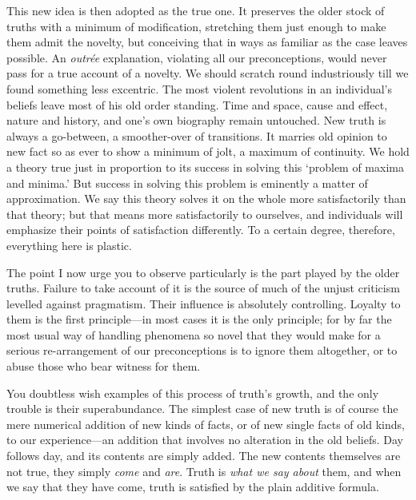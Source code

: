 This new idea is then adopted as the true one. It preserves the older
stock of truths with a minimum of modification, stretching them just
enough to make them admit the novelty, but conceiving that in ways as
familiar as the case leaves possible. An \textit{outr\'ee}
explanation, violating all our preconceptions, would never pass for a
true account of a novelty. We should scratch round industriously till
we found something less excentric. The most violent revolutions in an
individual's beliefs leave most of his old order standing. Time and
space, cause and  effect, nature and history, and one's own
biography remain untouched. New truth is always a go-between, a
smoother-over of transitions. It marries old opinion to new fact so as
ever to show a minimum of jolt, a maximum of continuity. We hold a
theory true just in proportion to its success in solving this `problem
of maxima and minima.' But success in solving this problem is
eminently a matter of approximation. We say this theory solves it on
the whole more satisfactorily than that theory; but that means more
satisfactorily to ourselves, and individuals will emphasize their
points of satisfaction differently. To a certain degree, therefore,
everything here is plastic.

The point I now urge you to observe particularly is the part played by
the older truths. Failure to take account of it is the source of much
of the unjust criticism levelled against pragmatism. Their influence
is absolutely controlling. Loyalty to them is the first
prin\-ci\-ple---in most cases it is the only principle; for by far the
most usual way of handling phenomena so novel that they would make for
a serious re-arrangement of our preconceptions is to ignore
them altogether, or to abuse those who bear witness for them.

You doubtless wish examples of this process of truth's growth, and the
only trouble is their superabundance. The simplest case of new truth
is of course the mere numerical addition of new kinds of facts, or of
new single facts of old kinds, to our ex\-pe\-ri\-ence---an addition
that involves no alteration in the old beliefs. Day follows day, and
its contents are simply added. The new contents themselves are not
true, they simply \textit{come} and \textit{are}. Truth is
\textit{what we say about} them, and when we say that they have come,
truth is satisfied by the plain additive formula.

